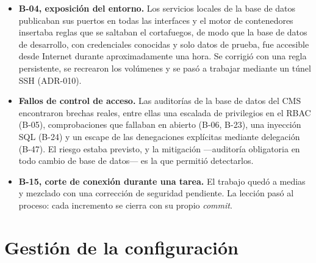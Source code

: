 \begin{itemize}
  \item \textbf{B-04, exposición del entorno.} Los servicios locales de la
        base de datos publicaban sus puertos en todas las interfaces y el
        motor de contenedores insertaba reglas que se saltaban el cortafuegos,
        de modo que la base de datos de desarrollo, con credenciales conocidas
        y solo datos de prueba, fue accesible desde Internet durante
        aproximadamente una hora. Se corrigió con una regla persistente, se
        recrearon los volúmenes y se pasó a trabajar mediante un túnel SSH
        (ADR-010).
  \item \textbf{Fallos de control de acceso.} Las auditorías de la base de
        datos del CMS encontraron brechas reales, entre ellas una
        escalada de privilegios en el RBAC (B-05), comprobaciones que fallaban
        en abierto (B-06, B-23), una inyección SQL (B-24) y un escape de las
        denegaciones explícitas mediante delegación (B-47). El riesgo estaba
        previsto, y la mitigación ---auditoría obligatoria en todo cambio de
        base de datos--- es la que permitió detectarlos.
  \item \textbf{B-15, corte de conexión durante una tarea.} El trabajo quedó
        a medias y mezclado con una corrección de seguridad pendiente. La
        lección pasó al proceso: cada incremento se cierra con su propio
        \textit{commit}.
\end{itemize}

\section{Gestión de la configuración}
\label{sec:plan-configuracion}

